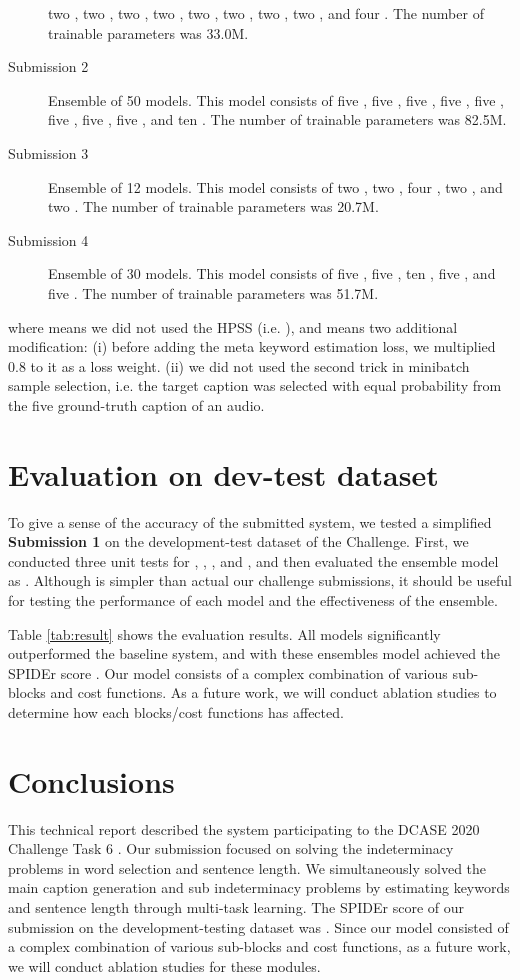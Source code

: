 \documentclass{article}
\begin{document}
\begin{sloppy}
\begin{description}
two ,
two ,
two ,
two ,
two ,
two ,
two , 
two , and 
four .
The number of trainable parameters was 33.0M.
\item[Submission 2] Ensemble of 50 models. This model consists of
five ,
five ,
five ,
five ,
five ,
five ,
five , 
five , and 
ten .
The number of trainable parameters was 82.5M.
\item[Submission 3] Ensemble of 12 models. This model consists of
two ,
two ,
four , 
two , and 
two .
The number of trainable parameters was 20.7M.
\item[Submission 4] Ensemble of 30 models. This model consists of
five ,
five ,
ten , 
five , and 
five .
The number of trainable parameters was 51.7M.
\end{description}
where  means we did not used the HPSS (i.e. ),
and  means two additional modification: 
(i) before adding the meta keyword estimation loss, we multiplied 0.8 to it as a loss weight.
(ii) we did not used the second trick in minibatch sample selection, i.e. the target caption was selected with equal probability from the five ground-truth caption of an audio.


\section{Evaluation on dev-test dataset}

To give a sense of the accuracy of the submitted system, we tested a simplified {\bf Submission 1} on the development-test dataset of the Challenge.
First, we conducted three unit tests for , , , and , and then evaluated the ensemble model as .
Although  is simpler than actual our challenge submissions, it should be useful for testing the performance of each model and the effectiveness of the ensemble.

Table \ref{tab:result} shows the evaluation results.
All models significantly outperformed the baseline system, and with these ensembles model achieved the SPIDEr score .
Our model consists of a complex combination of various sub-blocks and cost functions.
As a future work, we will conduct ablation studies to determine how each blocks/cost functions has affected.




\section{Conclusions}

This technical report described the system participating to the DCASE 2020 Challenge Task 6 \cite{task}. Our submission focused on solving the indeterminacy problems in word selection and sentence length. We simultaneously solved the main caption generation and sub indeterminacy problems by estimating keywords and sentence length through multi-task learning. The SPIDEr score of our submission on the development-testing dataset was . Since our model consisted of a complex combination of various sub-blocks and cost functions, as a future work, we will conduct ablation studies for these modules.




\end{sloppy}
\end{document}
